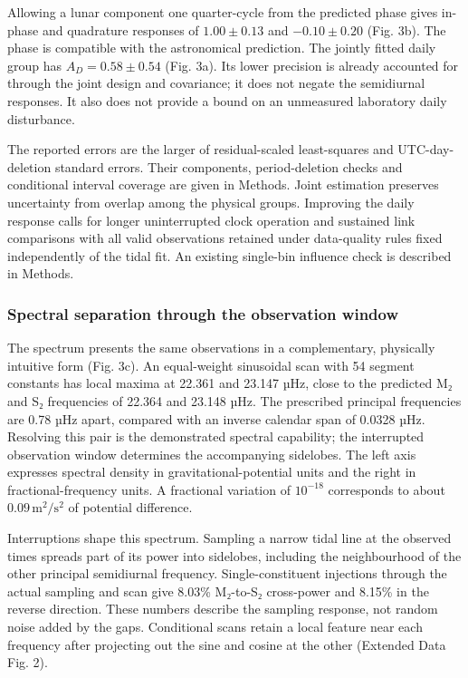 \documentclass[
  10pt,
  a4paper,
]{article}
\begin{document}
Allowing a lunar component one quarter-cycle from the predicted phase
gives in-phase and quadrature responses of \(1.00\pm0.13\) and
\(-0.10\pm0.20\) (Fig. 3b). The phase is compatible with the
astronomical prediction. The jointly fitted daily group has
\(A_D=0.58\pm0.54\) (Fig. 3a). Its lower precision is already accounted
for through the joint design and covariance; it does not negate the
semidiurnal responses. It also does not provide a bound on an unmeasured
laboratory daily disturbance.

The reported errors are the larger of residual-scaled least-squares and
UTC-day-deletion standard errors. Their components, period-deletion
checks and conditional interval coverage are given in Methods. Joint
estimation preserves uncertainty from overlap among the physical groups.
Improving the daily response calls for longer uninterrupted clock
operation and sustained link comparisons with all valid observations
retained under data-quality rules fixed independently of the tidal fit.
An existing single-bin influence check is described in Methods.

\hypertarget{spectral-separation-through-the-observation-window}{%
\subsubsection{Spectral separation through the observation
window}\label{spectral-separation-through-the-observation-window}}

The spectrum presents the same observations in a complementary,
physically intuitive form (Fig. 3c). An equal-weight sinusoidal scan
with 54 segment constants has local maxima at 22.361 and 23.147 µHz,
close to the predicted M₂ and S₂ frequencies of 22.364 and 23.148 µHz.
The prescribed principal frequencies are 0.78 µHz apart, compared with
an inverse calendar span of 0.0328 µHz. Resolving this pair is the
demonstrated spectral capability; the interrupted observation window
determines the accompanying sidelobes. The left axis expresses spectral
density in gravitational-potential units and the right in
fractional-frequency units. A fractional variation of \(10^{-18}\)
corresponds to about \(0.09\,\mathrm{m^2/s^2}\) of potential difference.

Interruptions shape this spectrum. Sampling a narrow tidal line at the
observed times spreads part of its power into sidelobes, including the
neighbourhood of the other principal semidiurnal frequency.
Single-constituent injections through the actual sampling and scan give
8.03\% M₂-to-S₂ cross-power and 8.15\% in the reverse direction. These
numbers describe the sampling response, not random noise added by the
gaps. Conditional scans retain a local feature near each frequency after
projecting out the sine and cosine at the other (Extended Data Fig. 2).
\end{document}
